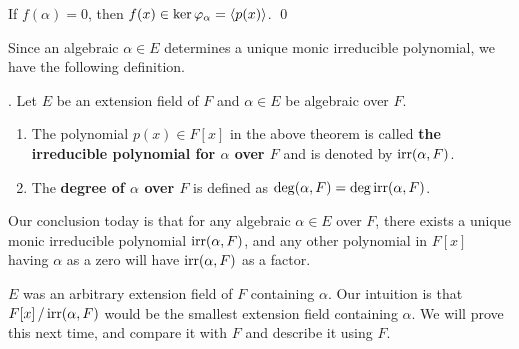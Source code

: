  If \(f(\alpha) = 0\), then \(f(x) \in \ker\varphi_\alpha = \left\langle p(x) \right\rangle\). \qed

Since an algebraic \(\alpha \in E\) determines a unique monic irreducible polynomial, we have the following definition.

. Let \(E\) be an extension field of \(F\) and \(\alpha \in E\) be algebraic over \(F\).
\begin{enumerate}
    \item The polynomial \(p(x) \in F[x]\) in the above theorem is called \textbf{the irreducible polynomial for \(\alpha\) over \(F\)} and is denoted by \(\mathrm{irr}(\alpha, F)\).
    \item The \textbf{degree of \(\alpha\) over \(F\)} is defined as \(\deg (\alpha, F) = \deg \mathrm{irr}(\alpha, F)\).
\end{enumerate}

Our conclusion today is that for any algebraic \(\alpha \in E\) over \(F\), there exists a unique monic irreducible polynomial \(\mathrm{irr}(\alpha, F)\), and any other polynomial in \(F[x]\) having \(\alpha\) as a zero will have \(\mathrm{irr}(\alpha, F)\) as a factor.

\(E\) was an arbitrary extension field of \(F\) containing \(\alpha\). Our intuition is that \(F[x] \operatorname{/} \mathrm{irr}(\alpha, F)\) would be the smallest extension field containing \(\alpha\). We will prove this next time, and compare it with \(F\) and describe it using \(F\).

\pagebreak
